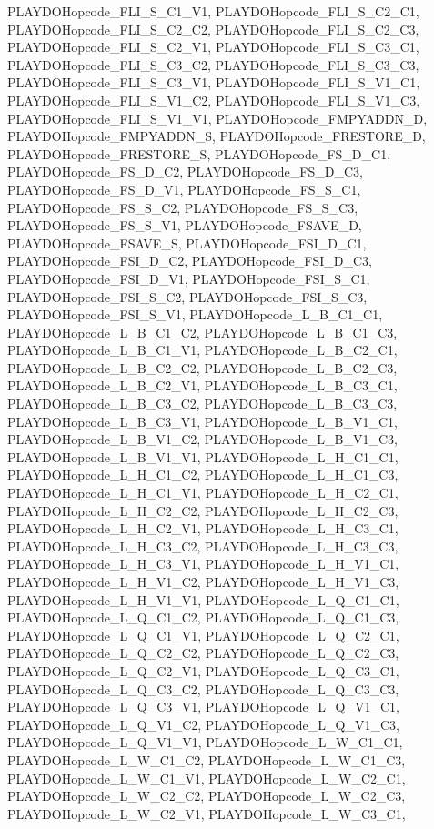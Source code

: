 PLAYDOHopcode\_\-FLI\_\-S\_\-C1\_\-V1, PLAYDOHopcode\_\-FLI\_\-S\_\-C2\_\-C1, PLAYDOHopcode\_\-FLI\_\-S\_\-C2\_\-C2, PLAYDOHopcode\_\-FLI\_\-S\_\-C2\_\-C3, PLAYDOHopcode\_\-FLI\_\-S\_\-C2\_\-V1, PLAYDOHopcode\_\-FLI\_\-S\_\-C3\_\-C1, PLAYDOHopcode\_\-FLI\_\-S\_\-C3\_\-C2, PLAYDOHopcode\_\-FLI\_\-S\_\-C3\_\-C3, PLAYDOHopcode\_\-FLI\_\-S\_\-C3\_\-V1, PLAYDOHopcode\_\-FLI\_\-S\_\-V1\_\-C1, PLAYDOHopcode\_\-FLI\_\-S\_\-V1\_\-C2, PLAYDOHopcode\_\-FLI\_\-S\_\-V1\_\-C3, PLAYDOHopcode\_\-FLI\_\-S\_\-V1\_\-V1, PLAYDOHopcode\_\-FMPYADDN\_\-D, PLAYDOHopcode\_\-FMPYADDN\_\-S, PLAYDOHopcode\_\-FRESTORE\_\-D, PLAYDOHopcode\_\-FRESTORE\_\-S, PLAYDOHopcode\_\-FS\_\-D\_\-C1, PLAYDOHopcode\_\-FS\_\-D\_\-C2, PLAYDOHopcode\_\-FS\_\-D\_\-C3, PLAYDOHopcode\_\-FS\_\-D\_\-V1, PLAYDOHopcode\_\-FS\_\-S\_\-C1, PLAYDOHopcode\_\-FS\_\-S\_\-C2, PLAYDOHopcode\_\-FS\_\-S\_\-C3, PLAYDOHopcode\_\-FS\_\-S\_\-V1, PLAYDOHopcode\_\-FSAVE\_\-D, PLAYDOHopcode\_\-FSAVE\_\-S, PLAYDOHopcode\_\-FSI\_\-D\_\-C1, PLAYDOHopcode\_\-FSI\_\-D\_\-C2, PLAYDOHopcode\_\-FSI\_\-D\_\-C3, PLAYDOHopcode\_\-FSI\_\-D\_\-V1, PLAYDOHopcode\_\-FSI\_\-S\_\-C1, PLAYDOHopcode\_\-FSI\_\-S\_\-C2, PLAYDOHopcode\_\-FSI\_\-S\_\-C3, PLAYDOHopcode\_\-FSI\_\-S\_\-V1, PLAYDOHopcode\_\-L\_\-B\_\-C1\_\-C1, PLAYDOHopcode\_\-L\_\-B\_\-C1\_\-C2, PLAYDOHopcode\_\-L\_\-B\_\-C1\_\-C3, PLAYDOHopcode\_\-L\_\-B\_\-C1\_\-V1, PLAYDOHopcode\_\-L\_\-B\_\-C2\_\-C1, PLAYDOHopcode\_\-L\_\-B\_\-C2\_\-C2, PLAYDOHopcode\_\-L\_\-B\_\-C2\_\-C3, PLAYDOHopcode\_\-L\_\-B\_\-C2\_\-V1, PLAYDOHopcode\_\-L\_\-B\_\-C3\_\-C1, PLAYDOHopcode\_\-L\_\-B\_\-C3\_\-C2, PLAYDOHopcode\_\-L\_\-B\_\-C3\_\-C3, PLAYDOHopcode\_\-L\_\-B\_\-C3\_\-V1, PLAYDOHopcode\_\-L\_\-B\_\-V1\_\-C1, PLAYDOHopcode\_\-L\_\-B\_\-V1\_\-C2, PLAYDOHopcode\_\-L\_\-B\_\-V1\_\-C3, PLAYDOHopcode\_\-L\_\-B\_\-V1\_\-V1, PLAYDOHopcode\_\-L\_\-H\_\-C1\_\-C1, PLAYDOHopcode\_\-L\_\-H\_\-C1\_\-C2, PLAYDOHopcode\_\-L\_\-H\_\-C1\_\-C3, PLAYDOHopcode\_\-L\_\-H\_\-C1\_\-V1, PLAYDOHopcode\_\-L\_\-H\_\-C2\_\-C1, PLAYDOHopcode\_\-L\_\-H\_\-C2\_\-C2, PLAYDOHopcode\_\-L\_\-H\_\-C2\_\-C3, PLAYDOHopcode\_\-L\_\-H\_\-C2\_\-V1, PLAYDOHopcode\_\-L\_\-H\_\-C3\_\-C1, PLAYDOHopcode\_\-L\_\-H\_\-C3\_\-C2, PLAYDOHopcode\_\-L\_\-H\_\-C3\_\-C3, PLAYDOHopcode\_\-L\_\-H\_\-C3\_\-V1, PLAYDOHopcode\_\-L\_\-H\_\-V1\_\-C1, PLAYDOHopcode\_\-L\_\-H\_\-V1\_\-C2, PLAYDOHopcode\_\-L\_\-H\_\-V1\_\-C3, PLAYDOHopcode\_\-L\_\-H\_\-V1\_\-V1, PLAYDOHopcode\_\-L\_\-Q\_\-C1\_\-C1, PLAYDOHopcode\_\-L\_\-Q\_\-C1\_\-C2, PLAYDOHopcode\_\-L\_\-Q\_\-C1\_\-C3, PLAYDOHopcode\_\-L\_\-Q\_\-C1\_\-V1, PLAYDOHopcode\_\-L\_\-Q\_\-C2\_\-C1, PLAYDOHopcode\_\-L\_\-Q\_\-C2\_\-C2, PLAYDOHopcode\_\-L\_\-Q\_\-C2\_\-C3, PLAYDOHopcode\_\-L\_\-Q\_\-C2\_\-V1, PLAYDOHopcode\_\-L\_\-Q\_\-C3\_\-C1, PLAYDOHopcode\_\-L\_\-Q\_\-C3\_\-C2, PLAYDOHopcode\_\-L\_\-Q\_\-C3\_\-C3, PLAYDOHopcode\_\-L\_\-Q\_\-C3\_\-V1, PLAYDOHopcode\_\-L\_\-Q\_\-V1\_\-C1, PLAYDOHopcode\_\-L\_\-Q\_\-V1\_\-C2, PLAYDOHopcode\_\-L\_\-Q\_\-V1\_\-C3, PLAYDOHopcode\_\-L\_\-Q\_\-V1\_\-V1, PLAYDOHopcode\_\-L\_\-W\_\-C1\_\-C1, PLAYDOHopcode\_\-L\_\-W\_\-C1\_\-C2, PLAYDOHopcode\_\-L\_\-W\_\-C1\_\-C3, PLAYDOHopcode\_\-L\_\-W\_\-C1\_\-V1, PLAYDOHopcode\_\-L\_\-W\_\-C2\_\-C1, PLAYDOHopcode\_\-L\_\-W\_\-C2\_\-C2, PLAYDOHopcode\_\-L\_\-W\_\-C2\_\-C3, PLAYDOHopcode\_\-L\_\-W\_\-C2\_\-V1, PLAYDOHopcode\_\-L\_\-W\_\-C3\_\-C1, 